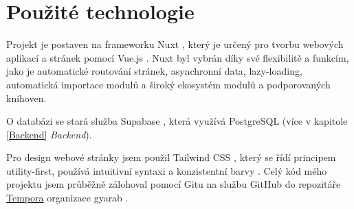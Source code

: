 \section{Použité technologie}

Projekt je postaven na frameworku Nuxt \cite{NUXT}, který je určený pro tvorbu webových aplikací a stránek pomocí Vue.js \cite{Vue.js}. Nuxt byl vybrán díky své flexibilitě a funkcím, jako je automatické routování stránek, asynchronní data, lazy-loading, automatická importace modulů \cite{NuxtImport-Fix} a široký ekosystém modulů a podporovaných knihoven.

O databázi se stará služba Supabase \cite{Supabase}, která využívá PostgreSQL (více v kapitole \ref{Backend} \textit{Backend}).

Pro design webové stránky jsem použil Tailwind CSS \cite{Tailwind-CSS}, který se řídí principem utility-first, používá intuitivní syntaxi a konzistentní barvy \cite{Colors-tailwind, Hex-Color-tailwind}.
Celý kód mého projektu jsem průběžně zálohoval pomocí Gitu na službu GitHub do repozitáře \href{https://github.com/gyarab/2024-4e-petrik-Tempora}{Tempora} organizace gyarab \cite{gyarab-github}.
